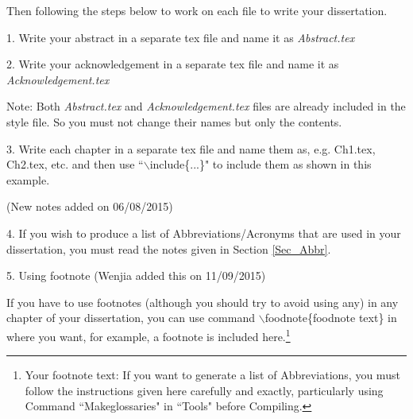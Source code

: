 Then following the steps below to work on each file to write your dissertation.    

 1. Write your abstract in a separate tex file and name it as \emph{Abstract.tex}
 
 2. Write your acknowledgement in a separate tex file and name it as \emph{Acknowledgement.tex}
   
 Note: Both \emph{Abstract.tex} and \emph{Acknowledgement.tex} files are already included in the style file.
 So you must not change their names but only the contents.    

 3. Write each chapter in a separate tex file and name them as, e.g. Ch1.tex, Ch2.tex, etc. 
 and then use ``$\backslash$include\{...\}" to include them as shown in this example.
 
(New notes added on 06/08/2015)

4. If you wish to produce a list of Abbreviations/Acronyms 
 that are used in your dissertation, you must read the notes given in Section \ref{Sec_Abbr}. 
%
% 
%
% 
%
% 
%
% 


5. Using footnote (Wenjia added this on 11/09/2015)
 
 If you have to use footnotes (although you should try to avoid using any) in any chapter of your dissertation, 
you can use command $\backslash$foodnote\{foodnote text\} in where you want, for example, a footnote is included here.\footnote{Your footnote text: If you want to generate a list of Abbreviations, you must follow the instructions given here carefully and exactly, particularly using Command ``Makeglossaries" in ``Tools" before Compiling.} 
	
